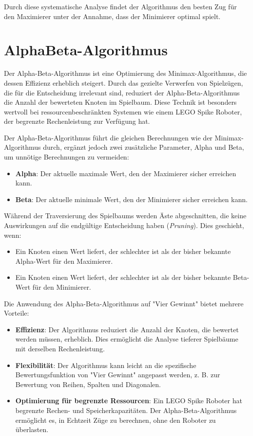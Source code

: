 Durch diese systematische Analyse findet der Algorithmus den besten Zug für den Maximierer unter der Annahme, dass der Minimierer optimal spielt.



\section{AlphaBeta-Algorithmus}

Der Alpha-Beta-Algorithmus ist eine Optimierung des Minimax-Algorithmus, die dessen Effizienz erheblich steigert. Durch das gezielte Verwerfen von Spielzügen, die für die Entscheidung irrelevant sind, reduziert der Alpha-Beta-Algorithmus die Anzahl der bewerteten Knoten im Spielbaum. Diese Technik ist besonders wertvoll bei ressourcenbeschränkten Systemen wie einem LEGO Spike Roboter, der begrenzte Rechenleistung zur Verfügung hat.

Der Alpha-Beta-Algorithmus führt die gleichen Berechnungen wie der Minimax-Algorithmus durch, ergänzt jedoch zwei zusätzliche Parameter, Alpha und Beta, um unnötige Berechnungen zu vermeiden:

\begin{itemize}
	\item \textbf{Alpha}: Der aktuelle maximale Wert, den der Maximierer sicher erreichen kann.
	\item \textbf{Beta}: Der aktuelle minimale Wert, den der Minimierer sicher erreichen kann.
\end{itemize}

Während der Traversierung des Spielbaums werden Äste abgeschnitten, die keine Auswirkungen auf die endgültige Entscheidung haben (\textit{Pruning}). Dies geschieht, wenn:
\begin{itemize}
	\item Ein Knoten einen Wert liefert, der schlechter ist als der bisher bekannte Alpha-Wert für den Maximierer.
	\item Ein Knoten einen Wert liefert, der schlechter ist als der bisher bekannte Beta-Wert für den Minimierer.
\end{itemize}

Die Anwendung des Alpha-Beta-Algorithmus auf "Vier Gewinnt" bietet mehrere Vorteile:
\begin{itemize}
	\item \textbf{Effizienz}: Der Algorithmus reduziert die Anzahl der Knoten, die bewertet werden müssen, erheblich. Dies ermöglicht die Analyse tieferer Spielbäume mit derselben Rechenleistung.
	\item \textbf{Flexibilität}: Der Algorithmus kann leicht an die spezifische Bewertungsfunktion von "Vier Gewinnt" angepasst werden, z. B. zur Bewertung von Reihen, Spalten und Diagonalen.
	\item \textbf{Optimierung für begrenzte Ressourcen}: Ein LEGO Spike Roboter hat begrenzte Rechen- und Speicherkapazitäten. Der Alpha-Beta-Algorithmus ermöglicht es, in Echtzeit Züge zu berechnen, ohne den Roboter zu überlasten.
\end{itemize}

